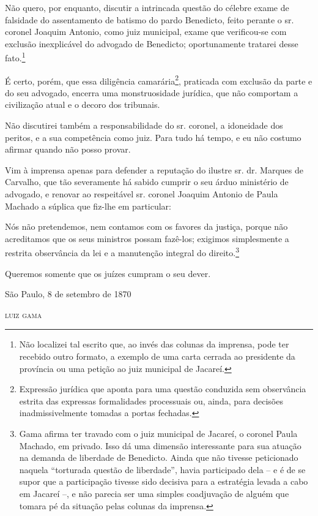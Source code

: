 Não quero, por enquanto, discutir a intrincada questão do célebre exame
de falsidade do assentamento de batismo do pardo Benedicto, feito
perante o sr. coronel Joaquim Antonio, como juiz municipal, exame que
verificou-se com exclusão inexplicável do advogado de Benedicto;
oportunamente tratarei desse fato.\footnote{ Não localizei tal escrito
  que, ao invés das colunas da imprensa, pode ter recebido outro
  formato, a exemplo de uma carta cerrada ao presidente da província ou
  uma petição ao juiz municipal de Jacareí.}

É certo, porém, que essa diligência camarária\footnote{ Expressão
  jurídica que aponta para uma questão conduzida sem observância estrita
  das expressas formalidades processuais ou, ainda, para decisões
  inadmissivelmente tomadas a portas fechadas.}, praticada com exclusão
da parte e do seu advogado, encerra uma monstruosidade jurídica, que não
comportam a civilização atual e o decoro dos tribunais.

Não discutirei também a responsabilidade do sr. coronel, a idoneidade
dos peritos, e a sua competência como juiz. Para tudo há tempo, e eu não
costumo afirmar quando não posso provar.

Vim à imprensa apenas para defender a reputação do ilustre sr. dr.
Marques de Carvalho, que tão severamente há sabido cumprir o seu árduo
ministério de advogado, e renovar ao respeitável sr. coronel Joaquim
Antonio de Paula Machado a súplica que fiz-lhe em particular:

Nós não pretendemos, nem contamos com os favores da justiça, porque não
acreditamos que os seus ministros possam fazê-los; exigimos simplesmente
a restrita observância da lei e a manutenção integral do
direito.\footnote{ Gama afirma ter travado com o juiz municipal de
  Jacareí, o coronel Paula Machado, em privado. Isso dá uma dimensão
  interessante para sua atuação na demanda de liberdade de Benedicto.
  Ainda que não tivesse peticionado naquela ``torturada questão de
  liberdade'', havia participado dela -- e é de se supor que a
  participação tivesse sido decisiva para a estratégia levada a cabo em
  Jacareí --, e não parecia ser uma simples coadjuvação de alguém que
  tomara pé da situação pelas colunas da imprensa.}

Queremos somente que os juízes cumpram o seu dever.

\begin{flushright}
São Paulo, 8 de setembro de 1870

\textsc{luiz gama}
\end{flushright}

